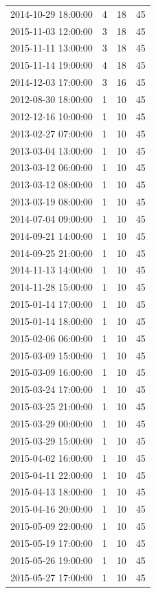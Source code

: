 \begin{tabular}{lrrr}
2014-10-29 18:00:00 & 4 & 18 & 45 \\
2015-11-03 12:00:00 & 3 & 18 & 45 \\
2015-11-11 13:00:00 & 3 & 18 & 45 \\
2015-11-14 19:00:00 & 4 & 18 & 45 \\
2014-12-03 17:00:00 & 3 & 16 & 45 \\
2012-08-30 18:00:00 & 1 & 10 & 45 \\
2012-12-16 10:00:00 & 1 & 10 & 45 \\
2013-02-27 07:00:00 & 1 & 10 & 45 \\
2013-03-04 13:00:00 & 1 & 10 & 45 \\
2013-03-12 06:00:00 & 1 & 10 & 45 \\
2013-03-12 08:00:00 & 1 & 10 & 45 \\
2013-03-19 08:00:00 & 1 & 10 & 45 \\
2014-07-04 09:00:00 & 1 & 10 & 45 \\
2014-09-21 14:00:00 & 1 & 10 & 45 \\
2014-09-25 21:00:00 & 1 & 10 & 45 \\
2014-11-13 14:00:00 & 1 & 10 & 45 \\
2014-11-28 15:00:00 & 1 & 10 & 45 \\
2015-01-14 17:00:00 & 1 & 10 & 45 \\
2015-01-14 18:00:00 & 1 & 10 & 45 \\
2015-02-06 06:00:00 & 1 & 10 & 45 \\
2015-03-09 15:00:00 & 1 & 10 & 45 \\
2015-03-09 16:00:00 & 1 & 10 & 45 \\
2015-03-24 17:00:00 & 1 & 10 & 45 \\
2015-03-25 21:00:00 & 1 & 10 & 45 \\
2015-03-29 00:00:00 & 1 & 10 & 45 \\
2015-03-29 15:00:00 & 1 & 10 & 45 \\
2015-04-02 16:00:00 & 1 & 10 & 45 \\
2015-04-11 22:00:00 & 1 & 10 & 45 \\
2015-04-13 18:00:00 & 1 & 10 & 45 \\
2015-04-16 20:00:00 & 1 & 10 & 45 \\
2015-05-09 22:00:00 & 1 & 10 & 45 \\
2015-05-19 17:00:00 & 1 & 10 & 45 \\
2015-05-26 19:00:00 & 1 & 10 & 45 \\
2015-05-27 17:00:00 & 1 & 10 & 45 \\

\end{tabular}
